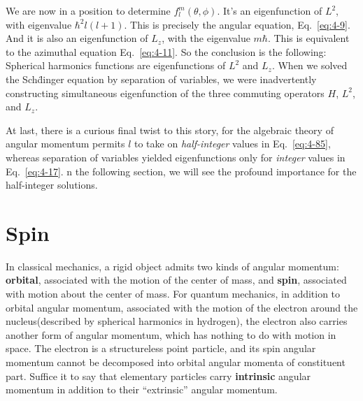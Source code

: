 We are now in a position to determine $f_l^m \left( \theta,\phi \right)$.
It's an eigenfunction of $L^2$, with eigenvalue $\hbar^2 l \left( l+1 \right)$.
This is precisely the angular equation, Eq.~\eqref{eq:4-9}.
And it is also an eigenfunction of $L_z$, with the eigenvalue $m\hbar$.
This is equivalent to the azimuthal equation Eq.~\eqref{eq:4-11}.
So the conclusion is the following: Spherical harmonics functions are eigenfunctions of $L^2$ and $L_z$.
When we solved the Sch\"dinger equation by separation of variables, we were inadvertently constructing simultaneous eigenfunction of the three commuting operators $H$, $L^2$, and $L_z$.

At last, there is a curious final twist to this story, for the algebraic theory of angular momentum permits $l$ to take on \textit{half-integer} values in Eq.~\eqref{eq:4-85}, whereas separation of variables yielded eigenfunctions only for \textit{integer} values in Eq.~\eqref{eq:4-17}.
n the following section, we will see the profound importance for the half-integer solutions.

\section{Spin}
In classical mechanics, a rigid object admits two kinds of angular momentum: \textbf{orbital}, associated with the motion of the center of mass, and \textbf{spin}, associated with motion about the center of mass.
For quantum mechanics, in addition to orbital angular momentum, associated with the motion of the electron around the nucleus(described by spherical harmonics in hydrogen), the electron also carries another form of angular momentum, which has nothing to do with motion in space.
The electron is a structureless point particle, and its spin angular momentum cannot be decomposed into  orbital angular momenta of constituent part.
Suffice it to say that elementary particles carry \textbf{intrinsic} angular momentum in addition to their ``extrinsic'' angular momentum.

